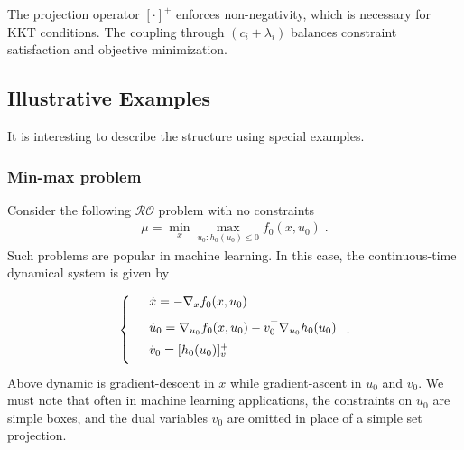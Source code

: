 \documentclass[journal,twoside,web]{ieeecolor}
\begin{document}
The projection operator $[\cdot]^+$ enforces non-negativity, which is necessary for KKT conditions. The coupling through $(c_i+\lambda_i)$ balances constraint satisfaction and objective minimization.

\subsection*{Illustrative Examples} \label{examples_and_comments}
It is interesting to describe the structure using special examples.

\subsubsection{Min-max problem} Consider the following $\mathcal{RO}$ problem with no constraints
\begin{align*}
\mu=\min_x\max_{u_0:h_0(u_0)\leq 0}f_0(x,u_0)\;.
\end{align*}
Such problems are popular in machine learning. In this case, the continuous-time dynamical system is given by

\begin{align*}
\left\{
\begin{array}{cl}
\vspace{3mm}
&\dot{x}=-\nabla_x f_0(x,u_0)\\
\vspace{2mm}
&\dot{u}_0=\nabla_{u_0}f_0(x,u_0)-v_0^\top \nabla_{u_0} h_0(u_0)\\
\vspace{2mm}
&\dot{v}_0=[h_0(u_0)]_v^+
\end{array}\right..
\end{align*}
Above dynamic is gradient-descent in $x$ while gradient-ascent in $u_0$ and $v_0$. We must note that often in machine learning applications, the constraints on $u_0$ are simple boxes, and the dual variables $v_0$ are omitted in place of a simple set projection.
\end{document}
